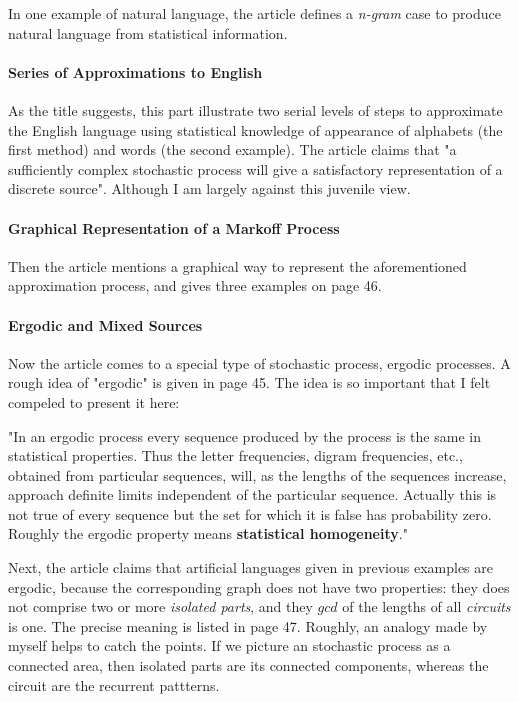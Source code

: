 In one example of natural language, the article defines a 
\textit{n-gram} case to produce natural language from statistical
information.

\paragraph{Series of Approximations to English}
As the title suggests, this part illustrate two serial levels of
steps to approximate the English language using statistical knowledge
of appearance of alphabets (the first method) and words (the second
example). The article claims that "a sufficiently complex stochastic 
process will give a satisfactory representation of a discrete source".
Although I am largely against this juvenile view.

\paragraph{Graphical Representation of a Markoff Process}
Then the article mentions a graphical way to represent the aforementioned
approximation process, and gives three examples on page 46.

\paragraph{Ergodic and Mixed Sources}
Now the article comes to a special type of stochastic process, ergodic
processes. A rough idea of "ergodic" is given in page 45. The idea is
so important that I felt compeled to present it here:

"In an ergodic process every sequence produced by
the process is the same in statistical properties. Thus the letter
frequencies, digram frequencies, etc., obtained from particular
sequences, will, as the lengths of the sequences increase, approach
definite limits independent of the particular sequence.
Actually
this is not true of every sequence but the set for which it is false
has probability zero. Roughly the ergodic property means 
\textbf{statistical homogeneity}."

Next, the article claims that artificial languages given in previous
examples are ergodic, because the corresponding graph does not
have two properties: they does not comprise two or more \textit{isolated
   	parts}, and they $gcd$ of the lengths of all \textit{circuits }is one.
The precise meaning is listed in page 47. Roughly, an analogy made by
myself helps to
catch the points. If we picture an stochastic process as a connected 
area, then isolated parts are its connected components, whereas the
circuit are the recurrent pattterns.


